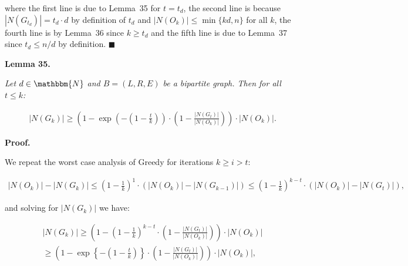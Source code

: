 where the first line is due to Lemma 35 for $t=t_{d}$, the second line is because $|N(G_{t_{d}})|=t_{d}\cdot d$ by definition of $t_{d}$ and $|N(O_{k})|\leq\min\{kd,n\}$ for all $k$, the fourth line is by Lemma 36 since $k\geq t_{d}$ and the fifth line is due to Lemma 37 since $t_{d}\leq n/d$ by definition.
\ensuremath{\blacksquare}\par






\par\medskip\noindent\textbf{\textbf{Lemma 35}\textbf{.}}\par



\emph{Let $d\in\mathbbm{N}$ and $B=(L,R,E)$ be a bipartite graph.
Then for all $t\leq k$:}\par


\[\begin{gathered}
|N(G_{k})|\geq\left(1-\exp\left(-\left(1-\frac{t}{k}\right)\right)\cdot\left(1-\frac{|N(G_{t})|}{|N(O_{k})|}\right)\right)\cdot|N(O_{k})|.
\end{gathered}\]






\par\medskip\noindent\textbf{Proof.}\par



We repeat the worst case analysis of Greedy for iterations $k\geq i>t$:\par


\[\begin{gathered}
\displaystyle|N(O_{k})|-|N(G_{k})|\leq\left(1-\frac{1}{k}\right)^{1}\cdot\left(|N(O_{k})|-|N(G_{k-1})|\right)\leq\left(1-\frac{1}{k}\right)^{k-t}\cdot\left(|N(O_{k})|-|N(G_{t})|\right),
\end{gathered}\]


and solving for $|N(G_{k})|$ we have:\par


\[\begin{gathered}
\displaystyle|N(G_{k})| \displaystyle\geq\left(1-\left(1-\frac{1}{k}\right)^{k-t}\cdot\left(1-\frac{|N(G_{t})|}{|N(O_{k})|}\right)\right)\cdot|N(O_{k})| \\
\displaystyle\geq\left(1-\exp\left\{-\left(1-\frac{t}{k}\right)\right\}\cdot\left(1-\frac{|N(G_{t})|}{|N(O_{k})|}\right)\right)\cdot|N(O_{k})|,
\end{gathered}\]


